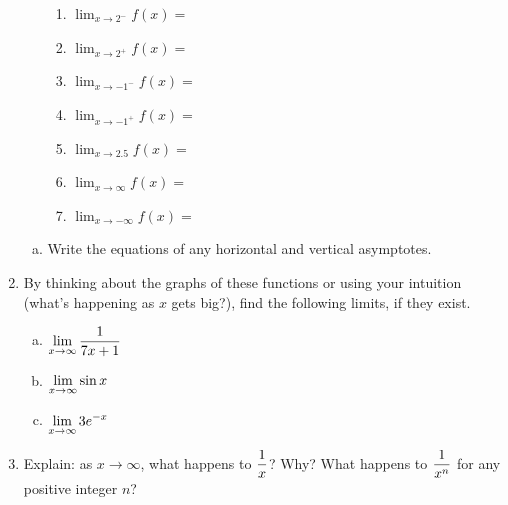 \documentclass[11pt,fleqn]{article}
\newcommand{\be}{\begin{enumerate}}
\newcommand{\ee}{\end{enumerate}}
\begin{document}
\begin{enumerate}
\begin{adjustbox}{valign=t,minipage={.45\textwidth}}
\begin{center}
\begin{enumerate}
   \begin{enumerate}
   \item $\displaystyle{\lim_{x\to 2^{-}} f(x) = }$
   
   \item $\displaystyle{\lim_{x\to 2^{+}} f(x) = }$
   
    \item $\displaystyle{\lim_{x\to -1^{-}} f(x) = }$
   
   \item $\displaystyle{\lim_{x\to -1^{+}} f(x) = }$
   
     \item $\displaystyle{\lim_{x\to 2.5} f(x) = }$
   
      \item $\displaystyle{\lim_{x\to \infty} f(x) = }$
      
         \item $\displaystyle{\lim_{x\to -\infty} f(x) = }$
         
         \ee
         
 
 \ee
\end{center}
\end{adjustbox}

\be[(b)]%
    \item Write the equations of any horizontal and vertical asymptotes.
    \ee
     
     \vspace{.7cm}


\item By thinking about the graphs of these functions or using your intuition (what's happening as $x$ gets big?), find the following limits, if they exist. 

  \begin{multicols}{3}{
      \vspace*{-0.45in}
      \begin{enumerate}[a)]
       \item $\displaystyle \lim_{x \to \infty} \frac{1}{7x + 1}$
      \item $\displaystyle \lim_{x \to \infty} \sin x$
      \item $\displaystyle \lim_{x \to \infty} 3 e^{-x}$
      \end{enumerate}}
  \end{multicols}
%
\vskip0.7in
%

\item Explain: as $x \to \infty$, what happens to $\displaystyle{\frac{1}{x}}$? Why? What happens to $\displaystyle \frac{1}{x^{n}}$ for any positive integer $n$?


\end{enumerate}
\end{document}
